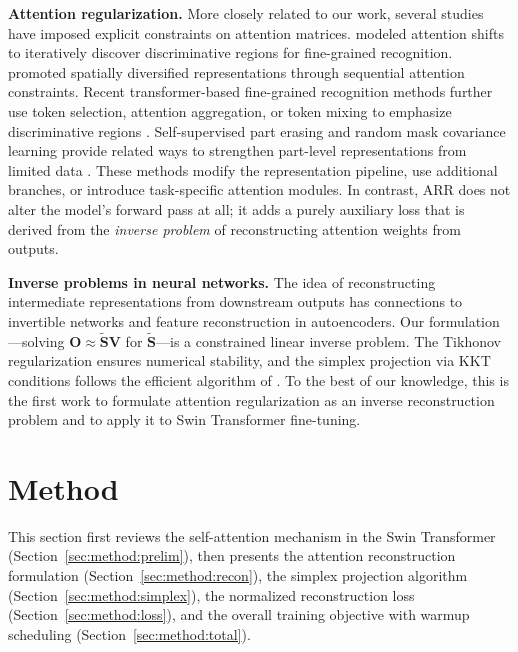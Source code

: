 \documentclass[review,12pt,authoryear]{elsarticle}
\newcommand{\method}{ARR}
\begin{document}
\textbf{Attention regularization.}
More closely related to our work, several studies have imposed explicit constraints on attention matrices.
\citet{niu2021attention} modeled attention shifts to iteratively discover discriminative regions for fine-grained recognition.
\citet{zhang2022sequential} promoted spatially diversified representations through sequential attention constraints.
Recent transformer-based fine-grained recognition methods further use token selection, attention aggregation, or token mixing to emphasize discriminative regions \citep{yu2023mixvit,wang2023aatrans,zhang2024accvit}.
Self-supervised part erasing and random mask covariance learning provide related ways to strengthen part-level representations from limited data \citep{yu2021maskcov,yu2022spare}.
These methods modify the representation pipeline, use additional branches, or introduce task-specific attention modules.
In contrast, \method{} does not alter the model's forward pass at all; it adds a purely auxiliary loss that is derived from the \emph{inverse problem} of reconstructing attention weights from outputs.

\textbf{Inverse problems in neural networks.}
The idea of reconstructing intermediate representations from downstream outputs has connections to invertible networks \citep{jacobsen2018revnet} and feature reconstruction in autoencoders.
Our formulation---solving $\mathbf{O} \approx \tilde{\mathbf{S}}\mathbf{V}$ for $\tilde{\mathbf{S}}$---is a constrained linear inverse problem.
The Tikhonov regularization \citep{tikhonov1977solutions} ensures numerical stability, and the simplex projection via KKT conditions follows the efficient algorithm of \citet{duchi2008efficient}.
To the best of our knowledge, this is the first work to formulate attention regularization as an inverse reconstruction problem and to apply it to Swin Transformer fine-tuning.

\section{Method}
\label{sec:method}

This section first reviews the self-attention mechanism in the Swin Transformer (Section~\ref{sec:method:prelim}), then presents the attention reconstruction formulation (Section~\ref{sec:method:recon}), the simplex projection algorithm (Section~\ref{sec:method:simplex}), the normalized reconstruction loss (Section~\ref{sec:method:loss}), and the overall training objective with warmup scheduling (Section~\ref{sec:method:total}).
\end{document}
